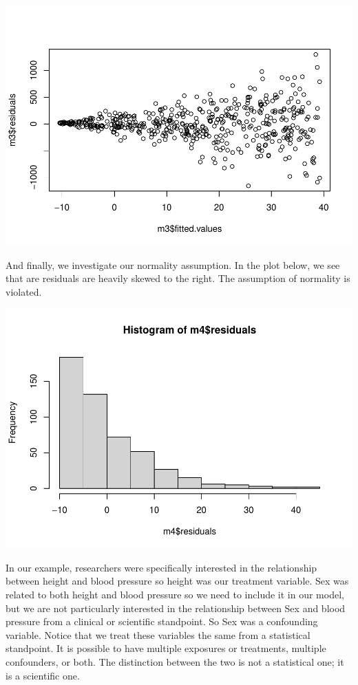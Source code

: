 \documentclass[]{book}
\begin{document}
\includegraphics{MA206supplement_files/figure-latex/unnamed-chunk-14-1.pdf}

And finally, we investigate our normality assumption. In the plot below, we see that are residuals are heavily skewed to the right. The assumption of normality is violated.

\includegraphics{MA206supplement_files/figure-latex/unnamed-chunk-15-1.pdf}

In our example, researchers were specifically interested in the relationship between height and blood pressure so height was our treatment variable. Sex was related to both height and blood pressure so we need to include it in our model, but we are not particularly interested in the relationship between Sex and blood pressure from a clinical or scientific standpoint. So Sex was a confounding variable. Notice that we treat these variables the same from a statistical standpoint. It is possible to have multiple exposures or treatments, multiple confounders, or both. The distinction between the two is not a statistical one; it is a scientific one.\\
\end{document}
